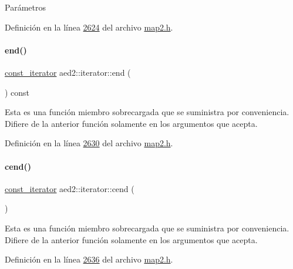 \begin{DoxyParams}{\-Parámetros}
\begin{DoxyCompactItemize}
Definición en la línea \hyperlink{map2_8h_source_l02624}{2624} del archivo \hyperlink{map2_8h_source}{map2.\+h}.

\mbox{\label{classaed2_1_1iterator_a66ee57cfa3bed6ffa74a1c8c23b13767_a66ee57cfa3bed6ffa74a1c8c23b13767}} 
\paragraph{\texorpdfstring{end()}{end()}\hspace{0.1cm}{\footnotesize\ttfamily [2/2]}}
{\footnotesize\ttfamily \hyperlink{classaed2_1_1iterator_1_1const__iterator}{const\+\_\+iterator} aed2\+::iterator\+::end (\begin{DoxyParamCaption}{ }\end{DoxyParamCaption}) const\hspace{0.3cm}{\ttfamily [inline]}}

Esta es una función miembro sobrecargada que se suministra por conveniencia. Difiere de la anterior función solamente en los argumentos que acepta. 

Definición en la línea \hyperlink{map2_8h_source_l02630}{2630} del archivo \hyperlink{map2_8h_source}{map2.\+h}.

\mbox{\label{classaed2_1_1iterator_a2d0d226485d9280d16a739d0b9dae525_a2d0d226485d9280d16a739d0b9dae525}} 
\paragraph{\texorpdfstring{cend()}{cend()}}
{\footnotesize\ttfamily \hyperlink{classaed2_1_1iterator_1_1const__iterator}{const\+\_\+iterator} aed2\+::iterator\+::cend (\begin{DoxyParamCaption}{ }\end{DoxyParamCaption})\hspace{0.3cm}{\ttfamily [inline]}}

Esta es una función miembro sobrecargada que se suministra por conveniencia. Difiere de la anterior función solamente en los argumentos que acepta. 

Definición en la línea \hyperlink{map2_8h_source_l02636}{2636} del archivo \hyperlink{map2_8h_source}{map2.\+h}.


\end{DoxyCompactItemize}
\end{DoxyParams}
